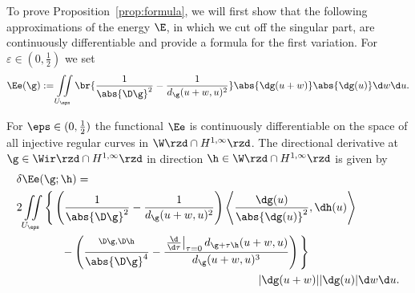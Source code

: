 To prove Proposition~\ref{prop:formula}, we will first show that the following approximations
of the energy $\E$, in which we cut off the singular part, are continuously differentiable
and provide a formula for the first variation.
For $\varepsilon\in(0,\tfrac12)$ we set
\begin{equation*}
  \Ee(\g) := \iint\limits_{ U_\eps} 
    \br{\frac1{\abs{\D\g}^2}-\frac1{d_\g(u+w,u)^2}}\abs{\dg(u+w)}\abs{\dg(u)}
    \d w\d u.  
\end{equation*}

\begin{lemma} \label{lem:FrechetDifferentiable}
For $\eps\in(0,\tfrac12)$ the functional $\Ee$ is continuously differentiable on the space of all
injective regular curves in $\W \rzd \cap H^{1,\infty}\rzd$.
The directional derivative at $\g\in \Wir \rzd \cap H^{1,\infty} \rzd$ in direction 
$\h\in \W \rzd \cap H^{1,\infty} \rzd$ is given by
\begin{equation}\label{eq:FrechetDifferentiable}
\begin{split}
    &\delta\Ee(\g;\h)  = \\
    & 2\iint\limits_{U_\eps} \Bigg\{
    \left(
      \frac 1 {\abs{\D\g}^2}-\frac 1 {d_\g(u+w,u)^2} \right)
      \left\langle \frac{\dg(u)}{\abs{\dg(u)}^2},\dh(u) \right\rangle 
\\
    &\qquad \qquad {}-
      \left( \frac{\sp{\D\g,\D\h}}{\abs{\D\g}^{4}}
	-\frac{ \left.\tfrac{\d}{\d\tau}\right|_{\tau=0}d_{\g+\tau\h}(u+w,u)}
		{d_\g(u+w,u)^{3}} \right)\Bigg\} 
\\ &\hspace{7.6cm} |\dg(u+w)| |\dg(u)|\d w\d u .
  \end{split}
\end{equation}
\end{lemma}

